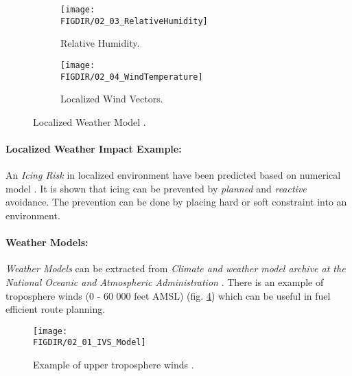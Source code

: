 \begin{figure}[H]
	\centering
	\begin{subfigure}{0.45\textwidth}
		\texttt{[image: \\FIGDIR/02\_03\_RelativeHumidity]}
		\caption{Relative Humidity.} 
		\label{fig:humidityRelativeLocalizedExample}
	\end{subfigure}
	\vspace{1em} 
	\begin{subfigure}{0.45\textwidth} %
		\texttt{[image: \\FIGDIR/02\_04\_WindTemperature]}
		\caption{Localized Wind Vectors.} %
		\label{fig:localizedWindVectorsExample}
	\end{subfigure}
	\caption{Localized Weather Model \cite{balaban2017dynamic}.} %
	\label{fig:localizedWeatherModelExample}
\end{figure}
    
\paragraph{Localized Weather Impact Example:} An \emph{Icing Risk} in localized environment have been predicted based on numerical model \cite{thompson2017numerical}. It is shown that icing can be prevented by \emph{planned} and \emph{reactive} avoidance. The prevention can be done by placing hard or soft constraint into an environment. 

    
\paragraph{Weather Models:} \emph{Weather Models} can be extracted from \emph{Climate and weather model archive at the National Oceanic and Atmospheric Administration} \cite{rutledge2006nomads}. There is an example of troposphere winds (0 - 60 000 feet AMSL) (fig. \ref{fig:ExampleOfTroposphereWinds}) which can be useful in fuel efficient route planning. 
    
\begin{figure}[H]
    \centering
    \texttt{[image: \\FIGDIR/02\_01\_IVS\_Model]}
    \caption{Example of upper troposphere winds \cite{rutledge2006nomads}.}
    \label{fig:ExampleOfTroposphereWinds}
\end{figure}

